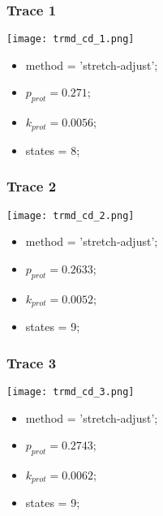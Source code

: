\subsubsection{Trace 1}
\begin{minipage}[c]{0.7\textwidth}
	\texttt{[image: trmd\_cd\_1.png]}
\end{minipage}
\hfill
\begin{minipage}[c]{0.45\textwidth}
	\begin{itemize}
		\item method = 'stretch-adjust';
		\item $p_{prot}=0.271$;
		\item $k_{prot}=0.0056$;
		\item states = 8;
	\end{itemize}
\end{minipage}

\subsubsection{Trace 2}
\begin{minipage}[c]{0.7\textwidth}
	\texttt{[image: trmd\_cd\_2.png]}
\end{minipage}
\hfill
\begin{minipage}[c]{0.45\textwidth}
	\begin{itemize}
		\item method = 'stretch-adjust';
		\item $p_{prot}=0.2633$;
		\item $k_{prot}=0.0052$;
		\item states = 9;
	\end{itemize}
\end{minipage}

\subsubsection{Trace 3}
\begin{minipage}[c]{0.7\textwidth}
	\texttt{[image: trmd\_cd\_3.png]}
\end{minipage}
\hfill
\begin{minipage}[c]{0.45\textwidth}
	\begin{itemize}
		\item method = 'stretch-adjust';
		\item $p_{prot}=0.2743$;
		\item $k_{prot}=0.0062$;
		\item states = 9;
	\end{itemize}
\end{minipage}


